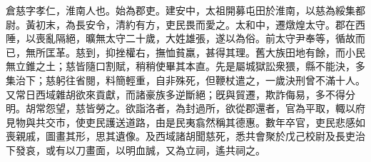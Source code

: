 \begin{pinyinscope}
 
 
 倉慈字孝仁，淮南人也。始為郡吏。建安中，太祖開募屯田於淮南，以慈為綏集都尉。黃初末，為長安令，清約有方，吏民畏而愛之。太和中，遷燉煌太守。郡在西陲，以喪亂隔絕，曠無太守二十歲，大姓雄張，遂以為俗。前太守尹奉等，循故而已，無所匡革。慈到，抑挫權右，撫恤貧羸，甚得其理。舊大族田地有餘，而小民無立錐之土；慈皆隨口割賦，稍稍使畢其本直。先是屬城獄訟衆猥，縣不能決，多集治下；慈躬往省閱，料簡輕重，自非殊死，但鞭杖遣之，一歲決刑曾不滿十人。又常日西域雜胡欲來貢獻，而諸豪族多逆斷絕；旣與貿遷，欺詐侮易，多不得分明。胡常怨望，慈皆勞之。欲詣洛者，為封過所，欲從郡還者，官為平取，輙以府見物與共交市，使吏民護送道路，由是民夷翕然稱其德惠。數年卒官，吏民悲感如喪親戚，圖畫其形，思其遺像。及西域諸胡聞慈死，悉共會聚於戊己校尉及長吏治下發哀，或有以刀畫面，以明血誠，又為立祠，遙共祠之。
 
 
 

\end{pinyinscope}
